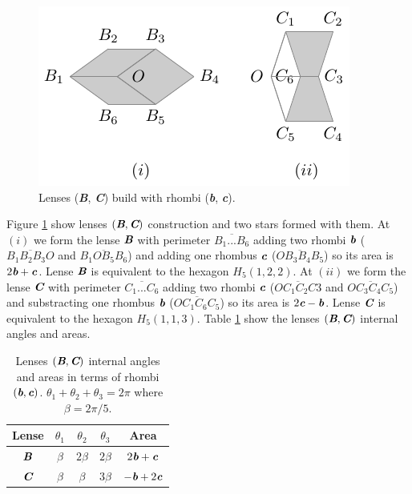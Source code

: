 \documentclass[11pt]{article}
\def\mathbi#1{\textbf{\em #1}}
\begin{document}
\begin{figure}[H]
\centering
\includegraphics[scale=1.1]{bc/bc}
\caption{Lenses (\mathbi{B}, \mathbi{C}) build with rhombi (\mathbi{b}, \mathbi{c}).}
\label{fig:bc-lenses}
\end{figure}

Figure \ref{fig:bc-lenses} show lenses $(\mathbi{B},\mathbi{C})$ construction and two stars formed with them.
At $(i)$ we form the lense $\mathbi{B}$ with perimeter $\overline{B_1...B_6}$ adding two rhombi $\mathbi{b}$ ($\overline{B_1B_2B_3O}$ and $\overline{B_1OB_5B_6}$) and adding one rhombus $\mathbi{c}$ ($\overline{OB_3B_4B_5}$) so its area is $2\mathbi{b} + \mathbi{c}$. Lense $\mathbi{B}$ is equivalent to the hexagon $H_5(1,2,2)$.
At $(ii)$ we form the lense $\mathbi{C}$ with perimeter $\overline{C_1...C_6}$ adding two rhombi $\mathbi{c}$ ($\overline{OC_1C_2C3}$ and $\overline{OC_3C_4C_5}$) and substracting one rhombus $\mathbi{b}$ ($\overline{OC_1C_6C_5}$) so its area is $2\mathbi{c} - \mathbi{b}$. Lense $\mathbi{C}$ is equivalent to the hexagon $H_5(1,1,3)$.
Table \ref{tbl:bc-lenses-angles} show the lenses $(\mathbi{B},\mathbi{C})$ internal angles and areas.

\begin{table}[H]
\begin{center}
\begin{tabular}{|c|c c c| c |} \hline
Lense & $\theta_1$ & $\theta_2$ & $\theta_3$ & Area \\ \hline
$\mathbi{B}$ & $\beta$ & $2\beta$ & $2\beta$ & $2\mathbi{b} + \mathbi{c}$
\\[0.5ex] \hline
$\mathbi{C}$ & $\beta$ & $\beta$ & $3\beta$ & $- \mathbi{b} + 2\mathbi{c}$
\\[0.5ex] \hline
\end{tabular}
\caption{Lenses $(\mathbi{B},\mathbi{C})$ internal angles and areas in terms of rhombi $(\mathbi{b},\mathbi{c})$. $\theta_1+\theta_2+\theta_3 = 2\pi$ where $\beta = 2\pi/5$.} 
\label{tbl:bc-lenses-angles}
\end{center}
\end{table}
\end{document}
